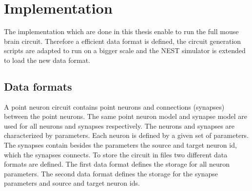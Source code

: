 %

\chapter{Implementation}

The implementation which are done in this thesis enable to run the full mouse brain circuit.
Therefore a efficient data format is defined, the circuit generation scripts are adapted to
run on a bigger scale and the NEST simulator is extended to load the new data format.

\section{Data formats}
A point neuron circuit contains point neurons and connections (synapses) between the point neurons.
The same point neuron model and synapse model are used for all neurons and synapses respectively.
The neurons and synapses are characterized by parameters.
Each neuron is defined by a given set of parameters.
The synapses contain besides the parameters the source and target neuron id, which the synapses connects.
To store the circuit in files two different data formats are defined.
The first data format defines the storage for all neuron parameters.
The second data format defines the storage for the synapse parameters and source and target neuron ids.

